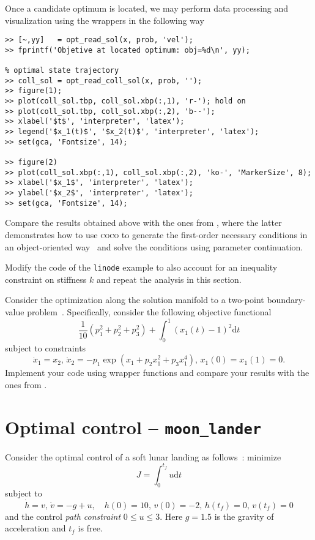 Once a candidate optimum is located, we may perform data processing and visualization using the wrappers in the following way
\begin{lstlisting}[language=coco-highlight]
>> [~,yy]   = opt_read_sol(x, prob, 'vel');
>> fprintf('Objetive at located optimum: obj=%d\n', yy);

% optimal state trajectory
>> coll_sol = opt_read_coll_sol(x, prob, '');
>> figure(1);
>> plot(coll_sol.tbp, coll_sol.xbp(:,1), 'r-'); hold on
>> plot(coll_sol.tbp, coll_sol.xbp(:,2), 'b--');
>> xlabel('$t$', 'interpreter', 'latex');
>> legend('$x_1(t)$', '$x_2(t)$', 'interpreter', 'latex');
>> set(gca, 'Fontsize', 14);

>> figure(2)
>> plot(coll_sol.xbp(:,1), coll_sol.xbp(:,2), 'ko-', 'MarkerSize', 8);
>> xlabel('$x_1$', 'interpreter', 'latex');
>> ylabel('$x_2$', 'interpreter', 'latex');
>> set(gca, 'Fontsize', 14);
\end{lstlisting}

\begin{exercises}
\item Compare the results obtained above with the ones from , where the latter demonstrates how to use \textsc{coco} to generate the first-order necessary conditions in an object-oriented way~\cite{staged_adjoint} and solve the conditions using parameter continuation.
\item Modify the code of the \texttt{linode} example to also account for an inequality constraint on stiffness $k$ and repeat the analysis in this section.
\item Consider the optimization along the solution manifold to a two-point boundary-value problem~\cite{Doedel-ii,staged_adjoint}. Specifically, consider the following objective functional
\begin{equation*}
\frac{1}{10}(p_1^2+p_2^2+p_3^2)+\int_0^1 (x_1(t)-1)^2\mathrm{d}t
\end{equation*}
subject to constraints
\begin{equation*}
\dot{x}_1 = x_2,\, \dot{x}_2 = -p_1\exp(x_1+p_2x_1^2+p_3x_1^4),\, x_1(0) = x_1(1) = 0.
\end{equation*}
Implement your code using wrapper functions and compare your results with the ones from .
\end{exercises}



\section{Optimal control -- \texttt{moon\_lander}}
\label{sec:moon}
Consider the optimal control of a soft lunar landing as follows~\cite{darby2011hp}: minimize 
\begin{equation}
J=\int_0^{t_f} u\mathrm{d}t
\end{equation}
subject to 
\begin{equation}
\label{eq:moon-bvp}
\dot{h}=v,\, \dot{v}=-g+u,\quad h(0)=10,\, v(0)=-2,\, h(t_f)=0,\, v(t_f)=0
\end{equation}
and the control \emph{path constraint} $0\leq u\leq 3$. Here $g=1.5$ is the gravity of acceleration and $t_f$ is free.


